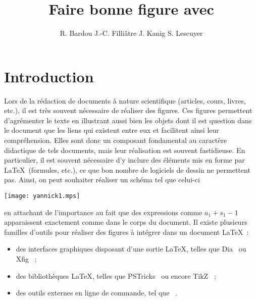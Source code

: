 \documentclass[twoside]{studia-Hermann}
\title[Faire bonne figure avec \mlpost]{Faire bonne figure avec \mlpost}
\author{R. Bardou \andauthor J.-C. Filliâtre \andauthor J. Kanig
  \andauthor S. Lescuyer}
\newcommand{\ocaml}{OCaml}
\newcommand{\mlpost}{\textsc{Mlpost}}
\newcommand{\metapost}{\MP}
\newcommand{\nomdetikz}{\textsf{TikZ}}
\newcommand{\pstricks}{\textsf{PSTricks}}
\newcommand{\dia}{\textsf{Dia}}
\newcommand{\xfig}{\textsf{Xfig}}
\begin{document}
\maketitle




\section{Introduction}

Lors de la rédaction de documents à nature scientifique (articles,
cours, livres, etc.), il est très souvent nécessaire de réaliser des
figures. Ces figures permettent d'agrémenter le texte en illustrant
aussi bien les objets dont il est question dans le document que les
liens qui existent entre eux et facilitent ainsi leur compréhension.
Elles sont donc un composant fondamental au caractère didactique de
tels documents, mais leur réalisation est souvent fastidieuse. En
particulier, il est souvent nécessaire d'y inclure des éléments mis en
forme par \LaTeX\ (formules, etc.), ce que bon nombre de logiciels de
dessin ne permettent pas. Ainsi, on peut souhaiter réaliser un schéma
tel que celui-ci
\begin{center}
  \texttt{[image: yannick1.mps]}
\end{center}
en attachant de l'importance au fait que des expressions comme
$a_1+s_1-1$ apparaissent exactement comme dans le corps du document.
Il existe plusieurs familles d'outils pour réaliser des figures à
intégrer dans un document \LaTeX~:
\begin{itemize}
\item des interfaces graphiques disposant d'une sortie \LaTeX, telles
  que \dia~\cite{dia} ou \xfig~\cite{xfig} ;
\item des bibliothèques \LaTeX, telles que \pstricks~\cite{pstricks}
  ou encore \nomdetikz~\cite{tikz} ; 
\item des outils externes en ligne de commande, tel que
  \metapost~\cite{metapost}.
\end{itemize}
\end{document}
